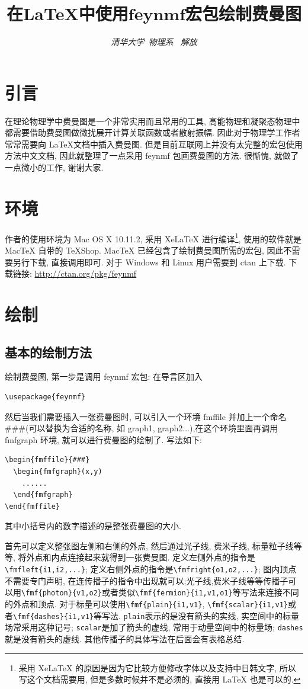 \documentclass{article}
\title{\bf{在\LaTeX 中使用$\mathbf{feynmf}$宏包绘制费曼图}}
\author{\emph{清华大学\, 物理系 \, 解放}}
\date{}
\begin{document}
\maketitle
\section{引言}
在理论物理学中费曼图是一个非常实用而且常用的工具, 高能物理和凝聚态物理中都需要借助费曼图做微扰展开计算关联函数或者散射振幅. 因此对于物理学工作者常常需要向 \LaTeX 文档中插入费曼图. 但是目前互联网上并没有太完整的宏包使用方法中文文档, 因此就整理了一点采用 feynmf 包画费曼图的方法. 很惭愧, 就做了一点微小的工作, 谢谢大家.

\section{环境}
作者的使用环境为 Mac OS X 10.11.2, 采用 XeLaTeX 进行编译\footnote{采用 XeLaTeX 的原因是因为它比较方便修改字体以及支持中日韩文字, 所以写这个文档需要用, 但是多数时候并不是必须的, 直接用 LaTeX 也是可以的.}, 使用的软件就是 MacTeX 自带的 TeXShop. MacTeX 已经包含了绘制费曼图所需的宏包, 因此不需要另行下载, 直接调用即可. 对于 Windows 和 Linux 用户需要到 ctan 上下载. 下载链接: \url{http://ctan.org/pkg/feynmf}

\section{绘制}
\subsection{基本的绘制方法}
绘制费曼图, 第一步是调用 feynmf 宏包: 在导言区加入
\begin{verbatim}
\usepackage{feynmf}
\end{verbatim}
然后当我们需要插入一张费曼图时, 可以引入一个环境 fmffile 并加上一个命名\#\#\#(可以替换为合适的名称, 如 graph1, graph2...),在这个环境里面再调用 fmfgraph 环境, 就可以进行费曼图的绘制了. 写法如下:
\begin{verbatim}
\begin{fmffile}{###}
  \begin{fmfgraph}(x,y)
    ......
  \end{fmfgraph}
\end{fmffile}
\end{verbatim}
其中小括号内的数字描述的是整张费曼图的大小.

首先可以定义整张图左侧和右侧的外点, 然后通过光子线, 费米子线, 标量粒子线等等, 将外点和内点连接起来就得到一张费曼图. 定义左侧外点的指令是\verb+\fmfleft{i1,i2,...}+; 定义右侧外点的指令是\verb+\fmfright{o1,o2,...}+; 图内顶点不需要专门声明, 在连传播子的指令中出现就可以;光子线,费米子线等等传播子可以用\verb+\fmf{photon}{v1,o2}+或者类似\verb+\fmf{fermion}{i1,v1,o1}+等写法来连接不同的外点和顶点. 对于标量可以使用\verb+\fmf{plain}{i1,v1}+, \verb+\fmf{scalar}{i1,v1}+或者\verb+\fmf{dashes}{i1,v1}+等写法. \verb+plain+表示的是没有箭头的实线, 实空间中的标量场常采用这种记号; \verb+scalar+是加了箭头的虚线, 常用于动量空间中的标量场; \verb+dashes+就是没有箭头的虚线. 其他传播子的具体写法在后面会有表格总结. 
\end{document}
